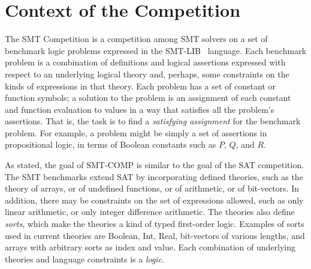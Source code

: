 \documentclass[twoside,11pt]{article}
\begin{document}
\section{Context of the Competition}
\label{sec:context}

The SMT Competition is a competition among SMT solvers on a set of benchmark logic problems expressed in the SMT-LIB~\cite{BarST-RR-10} language. Each benchmark problem is a combination of definitions and logical assertions expressed with respect to an underlying logical theory and, perhaps, some constraints on the kinds of expressions in that theory. Each problem has a set of constant or function symbols; a solution to the problem is an assignment of each constant and function evaluation to values in a way that satisfies all the problem's assertions. That is, the task is to find a \emph{satisfying assignment} for the benchmark problem. For example, a problem might be simply a set of assertions in 
propositional logic, in terms of Boolean constants such as $P$, $Q$, and $R$.

As stated, the goal of SMT-COMP is similar to the goal of the SAT competition. The SMT benchmarks extend SAT by incorporating defined theories, such as the theory of arrays, or of undefined functions, or of arithmetic, or of bit-vectors. In addition, there may be constraints on the set of expressions allowed, such as only linear arithmetic, or only integer difference arithmetic. The theories also define \emph{sorts}, which make the theories a kind of typed first-order logic. Examples of sorts used in current theories are Boolean, Int, Real, bit-vectors of various lengths, and arrays with arbitrary sorts as index and value. Each combination of underlying theories and language constraints is a \emph{logic}.
\end{document}
